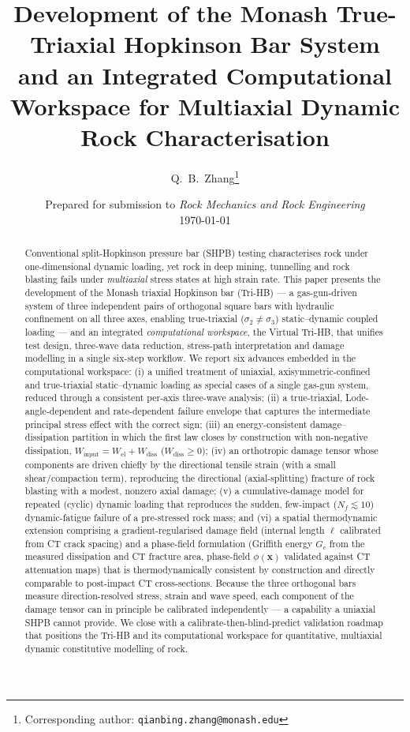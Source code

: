 \documentclass[11pt]{article}
\title{\bfseries Development of the Monash True-Triaxial Hopkinson Bar System
and an Integrated Computational Workspace for Multiaxial Dynamic Rock Characterisation}
\author[1]{Q.~B.~Zhang\thanks{Corresponding author: \texttt{qianbing.zhang@monash.edu}}}
\affil[1]{Department of Civil and Environmental Engineering, Monash University, Clayton, VIC 3800, Australia}
\date{\normalsize Prepared for submission to \textit{Rock Mechanics and Rock Engineering}\\[2pt]\small\today}
\begin{document}
\maketitle

\begin{abstract}
\noindent
Conventional split-Hopkinson pressure bar (SHPB) testing characterises rock
under one-dimensional dynamic loading, yet rock in deep mining, tunnelling and
rock blasting fails under \emph{multiaxial} stress states at high strain rate.
This paper presents the development of the Monash triaxial Hopkinson bar
(Tri-HB) --- a gas-gun-driven system of three independent pairs of orthogonal
square bars with hydraulic confinement on all three axes, enabling true-triaxial
($\sigma_2\neq\sigma_3$) static--dynamic coupled loading --- and an integrated
\emph{computational workspace}, the Virtual Tri-HB, that unifies test design, three-wave
data reduction, stress-path interpretation and damage modelling in a single
six-step workflow. We report six advances embedded in the computational workspace: (i) a
unified treatment of uniaxial, axisymmetric-confined and true-triaxial
static--dynamic loading as special cases of a single gas-gun system, reduced
through a consistent per-axis three-wave analysis; (ii) a
true-triaxial, Lode-angle-dependent and rate-dependent failure envelope that
captures the intermediate principal stress effect with the correct sign; (iii) an
energy-consistent damage--dissipation partition in which the first law closes by
construction with non-negative dissipation,
$W_{\mathrm{input}}=W_{\mathrm{el}}+W_{\mathrm{diss}}$ ($W_{\mathrm{diss}}\ge0$);
(iv) an orthotropic damage tensor whose components are driven chiefly by the
directional tensile strain (with a small shear/compaction term), reproducing the
directional (axial-splitting) fracture of rock blasting with a modest, nonzero
axial damage; (v) a cumulative-damage model for repeated (cyclic) dynamic
loading that reproduces the sudden, few-impact ($N_f\!\lesssim\!10$)
dynamic-fatigue failure of a pre-stressed rock mass; and (vi) a spatial
thermodynamic extension comprising a gradient-regularised damage field (internal
length $\ell$ calibrated from CT crack spacing) and a phase-field formulation
(Griffith energy $G_c$ from the measured dissipation and CT fracture area,
phase-field $\phi(\mathbf{x})$ validated against CT attenuation maps) that is
thermodynamically consistent by construction and directly comparable to
post-impact CT cross-sections. Because the three orthogonal bars measure
direction-resolved stress, strain and wave speed, each component of the damage
tensor can in principle be calibrated independently --- a capability a uniaxial
SHPB cannot provide. We close with a calibrate-then-blind-predict validation
roadmap that positions the Tri-HB and its computational workspace for quantitative,
multiaxial dynamic constitutive modelling of rock.
\end{abstract}
\end{document}
